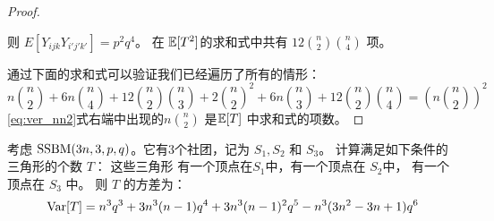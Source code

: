 \begin{proof}
\begin{enumerate}
 则 $E[Y_{ijk}Y_{i'j'k'}] = p^2q^4$。
 在 $\operatorname{\mathbb{E}}[T^2]$的求和式中共有 $12\binom{n}{2}\binom{n}{4}$ 
 项。
	\end{enumerate}
通过下面的求和式可以验证我们已经遍历了所有的情形：
\begin{equation}\label{eq:ver_nn2}
  n\binom{n}{2} + 6n\binom{n}{4} + 12\binom{n}{2} \binom{n}{3} + 2\binom{n}{2}^2 + 6n\binom{n}{3} + 12\binom{n}{2}\binom{n}{4} = \left(n\binom{n}{2}\right)^2  
\end{equation}
\eqref{eq:ver_nn2}式右端中出现的$n\binom{n}{2}$ 是$\operatorname{\mathbb{E}}[T] $ 中求和式的项数。
\end{proof}
\begin{lemma}\label{lem:SBM_tr_counting_3}
	考虑 $\operatorname{SSBM}(3n, 3, p, q)$。它有3个社团，记为
  $S_1,S_2$ 和 $S_3$。
  计算满足如下条件的三角形的个数 $T$：
  这些三角形 有一个顶点在$S_1$中，有一个顶点在 $S_2$中，
  有一个顶点在 $S_3$ 中。
	则 $T$ 的方差为：
	\begin{equation*}\label{eq:SBM_tr_counting_three}
	\operatorname{\mathrm{Var}}[T] = n^3 q^3  + 3n^3(n-1) q^4  + 3 n^3 (n-1)^2 q^5 - n^3(3n^2-3n+1)q^6
	\end{equation*}
\end{lemma}

